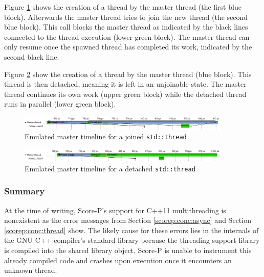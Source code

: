 Figure \ref{scorep:conc:pthread_join_timeline} shows the creation of a thread by the master thread (the first blue block). Afterwards the master thread tries to join the new thread (the second blue block). This call blocks the master thread as indicated by the black lines connected to the thread execution (lower green block). The master thread can only resume once the spawned thread has completed its work, indicated by the second black line.

Figure \ref{scorep:conc:pthread_detach_timeline} show the creation of a thread by the master thread (blue block). This thread is then detached, meaning it is left in an unjoinable state. The master thread continues its own work (upper green block) while the detached thread runs in parallel (lower green block).

\begin{figure}[htbp]
	\begin{center}
		\includegraphics[width=0.9\textwidth]{img/scorep_pthread_join_timeline.png}
		\caption{Emulated master timeline for a joined \texttt{std::thread}}
		\label{scorep:conc:pthread_join_timeline}
	\end{center}
\end{figure}

\begin{figure}[htbp]
	\begin{center}
		\includegraphics[width=0.9\textwidth]{img/scorep_pthread_detach_timeline.png}
		\caption{Emulated master timeline for a detached \texttt{std::thread}}
		\label{scorep:conc:pthread_detach_timeline}
	\end{center}
\end{figure}

\subsubsection{Summary}

At the time of writing, Score-P's support for C++11 multithreading is nonexistent as the error messages from Section \ref{scorep:conc:async} and Section \ref{scorep:conc:thread} show. The likely cause for these errors lies in the internals of the GNU C++ compiler's standard library because the threading support library is compiled into the shared library object. Score-P is unable to instrument this already compiled code and crashes upon execution once it encounters an unknown thread.

